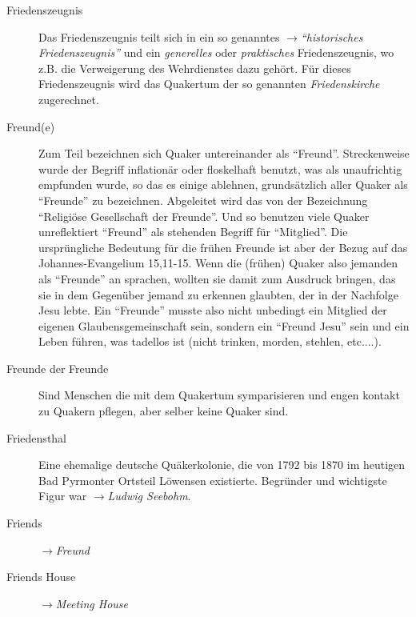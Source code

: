 \begin{description}
 \item[Friedenszeugnis] Das Friedenszeugnis teilt sich in ein so genanntes
 $\to$\textit{"`historisches Friedenszeugnis"'} und ein \textit{generelles}
 oder \textit{praktisches} Friedenszeugnis, wo z.B. die Verweigerung des
 Wehrdienstes dazu gehört. Für dieses Friedenszeugnis wird das Quakertum der
 so genannten \textit{Friedenskirche} zugerechnet.

 \item[Freund(e)] Zum Teil bezeichnen sich Quaker untereinander als "`Freund"'.
 Streckenweise wurde der Begriff inflationär oder floskelhaft benutzt, was
 als unaufrichtig empfunden wurde, so das es einige ablehnen, grundsätzlich
 aller Quaker als "`Freunde"' zu bezeichnen. Abgeleitet wird das von der
 Bezeichnung "`Religiöse Gesellschaft der Freunde"'. Und so benutzen viele
 Quaker unreflektiert "`Freund"' als stehenden Begriff für "`Mitglied"'. Die
 ursprüngliche Bedeutung für die frühen Freunde ist aber der Bezug auf das
 Johannes-Evangelium 15,11-15. Wenn die (frühen) Quaker also jemanden als
 "`Freunde"' an sprachen, wollten sie damit zum Ausdruck bringen, das sie in dem
 Gegenüber jemand zu erkennen glaubten, der in der Nachfolge Jesu lebte. Ein
 "`Freunde"' musste also nicht unbedingt ein Mitglied der eigenen
 Glaubensgemeinschaft sein, sondern ein "`Freund Jesu"' sein und ein Leben führen,
 was tadellos ist (nicht trinken, morden, stehlen, etc....).
 
 \item[Freunde der Freunde] Sind Menschen die mit dem Quakertum symparisieren
 und engen kontakt zu Quakern pflegen, aber selber keine Quaker sind.

 \item[Friedensthal] Eine ehemalige deutsche Quäkerkolonie, die von 1792 bis
 1870 im heutigen Bad Pyrmonter Ortsteil Löwensen existierte. Begründer und
 wichtigste Figur war $\to$\textit{Ludwig Seebohm}.

 \item[Friends] $\to$\textit{Freund}

 \item[Friends House] $\to$\textit{Meeting House}


\end{description}
